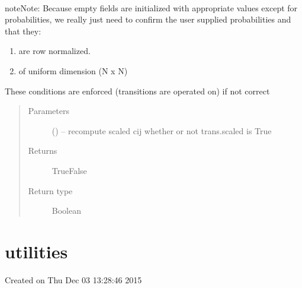 \documentclass[letterpaper,10pt,english]{sphinxmanual}
\begin{document}
\begin{fulllineitems}
\begin{fulllineitems}
\end{fulllineitems}


\begin{fulllineitems}
\label{\detokenize{rst/transition:mstack.transition.Transitions.validate_transitions}}~
\begin{sphinxadmonition}{note}{Note:}
Because empty fields are initialized with appropriate values except for probabilities,
we really just need to confirm the user supplied probabilities and that they:
\begin{enumerate}
\item {} 
are row normalized.

\item {} 
of uniform dimension (N x N)

\end{enumerate}

These conditions are enforced (transitions are operated on) if not correct
\end{sphinxadmonition}
\begin{quote}\begin{description}
\item[{Parameters}] \leavevmode
{} () -- recompute scaled cij whether or not trans.scaled is True

\item[{Returns}] \leavevmode
True\textbar{}False

\item[{Return type}] \leavevmode
Boolean

\end{description}\end{quote}

\end{fulllineitems}


\end{fulllineitems}



\section{utilities}
\label{\detokenize{rst/utilities:module-mstack.utilities}}\label{\detokenize{rst/utilities::doc}}\label{\detokenize{rst/utilities:utilities}}
Created on Thu Dec 03 13:28:46 2015
\end{document}

